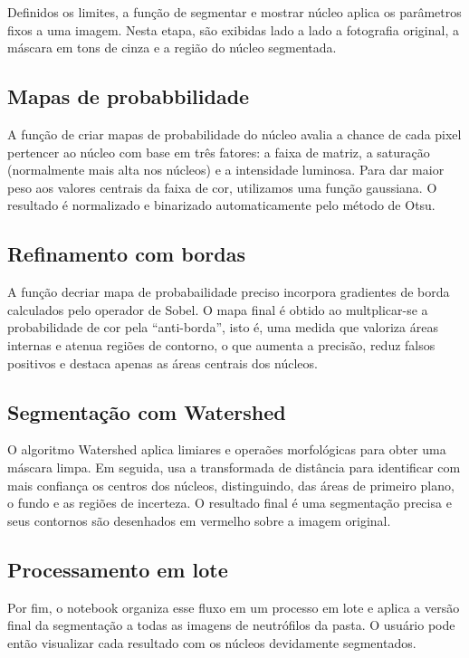 \documentclass{article}
\begin{document}
Definidos os limites, a função de segmentar e mostrar núcleo aplica os parâmetros fixos a uma imagem. Nesta etapa, são exibidas lado a lado a fotografia original, a máscara em tons de cinza e a região do núcleo segmentada.

\subsection{Mapas de probabbilidade}

A função de criar mapas de probabilidade do núcleo avalia a chance de cada pixel pertencer ao núcleo com base em três fatores: a faixa de matriz, a saturação (normalmente mais alta nos núcleos) e a intensidade luminosa. Para dar maior peso aos valores centrais da faixa de cor, utilizamos uma função gaussiana. O resultado é normalizado e binarizado automaticamente pelo método de Otsu.

\subsection{Refinamento com bordas}

A função decriar mapa de probabailidade preciso incorpora gradientes de borda calculados pelo operador de Sobel. O mapa final é obtido ao multplicar-se a probabilidade de cor pela ``anti-borda'', isto é, uma medida que valoriza áreas internas e atenua regiões de contorno, o que aumenta a precisão, reduz falsos positivos e destaca apenas as áreas centrais dos núcleos.

\subsection{Segmentação com Watershed}

O algoritmo Watershed aplica limiares e operaões morfológicas para obter uma máscara limpa. Em seguida, usa a transformada de distância para identificar com mais confiança os centros dos núcleos, distinguindo, das áreas de primeiro plano, o fundo e as regiões de incerteza. O resultado final é uma segmentação precisa e seus contornos são desenhados em vermelho sobre a imagem original.

\subsection{Processamento em lote}

Por fim, o notebook organiza esse fluxo em um processo em lote e aplica a versão final da segmentação a todas as imagens de neutrófilos da pasta. O usuário pode então visualizar cada resultado com os núcleos devidamente segmentados.
\end{document}
